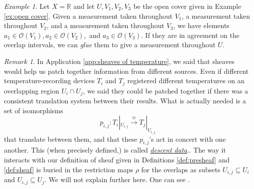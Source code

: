 \documentclass{book}
\def\mc{\mathcal}
\def\RR{{\mathbb R}}
\def\taking{\colon}
\def\ss{\subseteq}
\def\iso{\cong}
\newcommand{\To}[1]{\xrightarrow{#1}}
\def\mcO{\mc{O}}
\theoremstyle{remark}
\newtheorem{remark}[subsubsection]{Remark}
\newtheorem{example}[subsubsection]{Example}
\theoremstyle{definition}
\begin{document}
\begin{example}

Let $X=\RR$ and let $U, V_1,V_2,V_3$ be the open cover given in Example \ref{ex:open cover}. Given a measurement taken throughout $V_1$, a measurement taken throughout $V_2$, and a measurement taken throughout $V_3$, we have elements $a_1\in\mcO(V_1), a_2\in\mcO(V_2),$ and $a_3\in\mcO(V_3)$. If they are in agreement on the overlap intervals, we can {\em glue}  them to give a measurement throughout $U$.

\end{example}

\begin{remark}

In Application \ref{app:sheaves of temperature}, we said that sheaves would help us patch together information from different sources. Even if different temperature-recording devices $T_i$ and $T_j$ registered different temperatures on an overlapping region $U_i\cap U_j$, we said they could be patched together if there was a consistent translation system between their results. What is actually needed is a set of isomorphisms 
$$p_{i,j}\taking T_i|_{U_{i,j}}\To{\iso} T_j|_{U_{i,j}}$$ 
that translate between them, and that these $p_{i,j}$'s act in concert with one another. This (when precisely defined,) is called \href{http://en.wikipedia.org/wiki/Descent_theory}{\em descent data}.. The way it interacts with our definition of sheaf given in Definitions \ref{def:presheaf} and \ref{def:sheaf} is buried in the restriction maps $\rho$ for the overlaps as subsets $U_{i,j}\ss U_i$ and $U_{i,j}\ss U_j$. We will not explain further here. One can see \cite{Gro}.

\end{remark}
\end{document}
